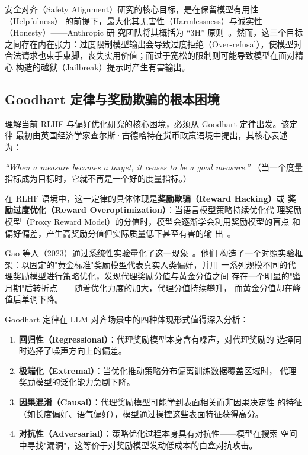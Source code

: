 \documentclass[12pt,a4paper,UTF8]{ctexart}
\begin{document}
安全对齐（Safety Alignment）研究的核心目标，是在保留模型有用性（Helpfulness）
的前提下，最大化其无害性（Harmlessness）与诚实性（Honesty）——Anthropic 研
究团队将其概括为 ``3H'' 原则~\cite{bai2022constitutional}。然而，这三个目标
之间存在内在张力：过度限制模型输出会导致过度拒绝（Over-refusal），使模型对
合法请求也束手束脚，丧失实用价值；而过于宽松的限制则可能导致模型在面对精心
构造的越狱（Jailbreak）提示时产生有害输出。

\subsection{Goodhart 定律与奖励欺骗的根本困境}

理解当前 RLHF 与偏好优化研究的核心困境，必须从 Goodhart 定律出发。该定律
最初由英国经济学家查尔斯·古德哈特在货币政策语境中提出，其核心表述为：

\begin{tcolorbox}[colback=gray!8, colframe=black!55, title=Goodhart 定律, fonttitle=\bfseries]
\textit{``When a measure becomes a target, it ceases to be a good measure.''}
（当一个度量指标成为目标时，它就不再是一个好的度量指标。）
\end{tcolorbox}

在 RLHF 语境中，这一定律的具体体现是\textbf{奖励欺骗（Reward Hacking）}或
\textbf{奖励过度优化（Reward Overoptimization）}：当语言模型策略持续优化代
理奖励模型（Proxy Reward Model）的分值时，模型会逐渐学会利用奖励模型的盲点
和偏好偏差，产生高奖励分值但实际质量低下甚至有害的输
出~\cite{gao2023scaling}。

Gao 等人（2023）通过系统性实验量化了这一现象~\cite{gao2023scaling}。他们
构造了一个对照实验框架：以固定的"黄金标准"奖励模型代表真实人类偏好，并用
一系列规模不同的代理奖励模型进行策略优化，发现代理奖励分值与黄金分值之间
存在一个明显的"蜜月期"后转折点——随着优化力度的加大，代理分值持续攀升，
而黄金分值却在峰值后单调下降。

Goodhart 定律在 LLM 对齐场景中的四种体现形式值得深入分析：
\begin{enumerate}[leftmargin=2em]
  \item \textbf{回归性（Regressional）}：代理奖励模型本身含有噪声，对代理奖励的
    选择同时选择了噪声方向上的偏差。
  \item \textbf{极端化（Extremal）}：当优化推动策略分布偏离训练数据覆盖区域时，
    代理奖励模型的泛化能力急剧下降。
  \item \textbf{因果混淆（Causal）}：代理奖励模型可能学到表面相关而非因果决定性
    的特征（如长度偏好、语气偏好），模型通过操控这些表面特征获得高分。
  \item \textbf{对抗性（Adversarial）}：策略优化过程本身具有对抗性——模型在搜索
    空间中寻找"漏洞"，这等价于对奖励模型发动低成本的白盒对抗攻击。
\end{enumerate}
\end{document}
